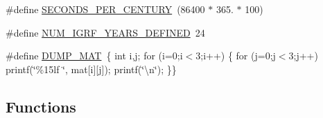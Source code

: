 \begin{DoxyCompactItemize}
\item 
\#define \hyperlink{cxform-manual_8c_abdf8c3704a0d990a87e48f1a763d405f}{S\-E\-C\-O\-N\-D\-S\-\_\-\-P\-E\-R\-\_\-\-C\-E\-N\-T\-U\-R\-Y}~(86400 $\ast$ 365. $\ast$ 100)
\item 
\#define \hyperlink{cxform-manual_8c_a73ea55604473e02996222de081a76e7f}{N\-U\-M\-\_\-\-I\-G\-R\-F\-\_\-\-Y\-E\-A\-R\-S\-\_\-\-D\-E\-F\-I\-N\-E\-D}~24
\item 
\#define \hyperlink{cxform-manual_8c_a78e3086280b9a0d341f415a8aef06c55}{D\-U\-M\-P\-\_\-\-M\-A\-T}~\{ int i,j; for (i=0;i$<$3;i++) \{ for (j=0;j$<$3;j++) printf(\char`\"{}\%15lf \char`\"{}, mat\mbox{[}i\mbox{]}\mbox{[}j\mbox{]}); printf(\char`\"{}\textbackslash{}n\char`\"{}); \}\}
\end{DoxyCompactItemize}
\subsection*{Functions}
